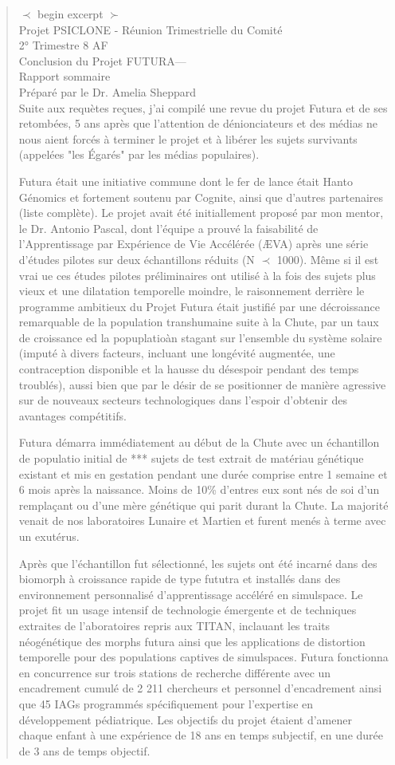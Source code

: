 \begin{quotation} $\prec$ begin excerpt $\succ$ \\ Projet PSICLONE - Réunion Trimestrielle du Comité\\ 2° Trimestre 8 AF\\ Conclusion du Projet FUTURA— \\ Rapport sommaire\\ Préparé par le Dr. Amelia Sheppard	\\ Suite aux requètes reçues, j'ai compilé une revue du projet Futura et de ses retombées, 5 ans après que l'attention de dénionciateurs et des médias ne nous aient forcés à terminer le projet et à libérer les sujets survivants (appelées "les Égarés" par les médias populaires). 

Futura était une initiative commune dont le fer de lance était Hanto Génomics et fortement soutenu par Cognite, ainsi que d'autres partenaires (liste complète). Le projet avait été initiallement proposé par mon mentor, le Dr. Antonio Pascal, dont l'équipe a prouvé la faisabilité de l'Apprentissage par Expérience de Vie Accélérée (ÆVA) après une série d'études pilotes sur deux échantillons réduits (N $ \prec $ 1000). Même si il est vrai ue ces études pilotes préliminaires ont utilisé à la fois des sujets plus vieux et une dilatation temporelle moindre, le raisonnement derrière le programme ambitieux du Projet Futura était justifié par une décroissance remarquable de la population transhumaine suite à la Chute, par un taux de croissance ed la popuplatioàn stagant sur l'ensemble du système solaire (imputé à divers facteurs, incluant une longévité augmentée, une contraception disponible et la hausse du désespoir pendant des temps troublés), aussi bien que par le désir de se positionner de manière agressive sur de nouveaux secteurs technologiques dans l'espoir d'obtenir des avantages compétitifs. 

Futura démarra immédiatement au début de la Chute avec un échantillon de populatio initial de *** sujets de test extrait de matériau génétique existant et mis en gestation pendant une durée comprise entre 1 semaine et 6 mois après la naissance. Moins de 10\% d'entres eux sont nés de soi d'un remplaçant ou d'une mère génétique qui parit durant la Chute. La majorité venait de nos laboratoires Lunaire et Martien et furent menés à terme avec un exutérus. 

Après que l'échantillon fut sélectionné, les sujets ont été incarné dans des biomorph à croissance rapide de type fututra et installés dans des environnement personnalisé d'apprentissage accéléré en simulspace. Le projet fit un usage intensif de technologie émergente et de techniques extraites de l'aboratoires repris aux TITAN, inclauant les traits néogénétique des morphs futura ainsi que les applications de distortion temporelle pour des populations captives de simulspaces. Futura fonctionna en concurrence sur trois stations de recherche différente avec un encadrement cumulé de 2 211 chercheurs et personnel d'encadrement ainsi que 45 IAGs programmés spécifiquement pour l'expertise en développement pédiatrique. Les objectifs du projet étaient d'amener chaque enfant à une expérience de 18 ans en temps subjectif, en une durée de 3 ans de temps objectif. 


\end{quotation}
